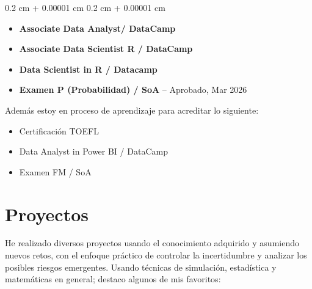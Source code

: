 \documentclass[10pt, letterpaper]{article}
\newenvironment{highlightsforbulletentries}{
    \begin{itemize}[
        topsep=0.10 cm,
        parsep=0.10 cm,
        partopsep=0pt,
        itemsep=0pt,
        leftmargin=10pt
    ]
}{
    \end{itemize}
} %
\newenvironment{onecolentry}{
    \begin{adjustwidth}{
        0.2 cm + 0.00001 cm
    }{
        0.2 cm + 0.00001 cm
    }
}{
    \end{adjustwidth}
} %
\let\hrefWithoutArrow\href
\renewcommand{\href}[2]{\hrefWithoutArrow{#1}{\ifthenelse{\equal{#2}{}}{ }{#2 }\raisebox{.15ex}{\footnotesize \faExternalLink*}}}
\begin{document}
    \begin{onecolentry}
        \begin{highlightsforbulletentries}
            \item \textbf{Associate Data Analyst/ DataCamp} \href{https://drive.google.com/file/d/1EqzyjRkWOJBlU9zUTpkcUcj6QtuXRZfK/view?usp=sharing}{}
            \item \textbf{Associate Data Scientist R / DataCamp} \href{https://drive.google.com/file/d/1xVLk15A1LBbyXH1fZnd4eBTaJ4d8FLLO/view?usp=sharing}{}
            \item \textbf{Data Scientist in R / Datacamp }\href{https://drive.google.com/file/d/1Woe6xqxofloFZ9uM2f5VsdGxY-WQWCRI/view?usp=sharing}{} \\
            \item \textbf{Examen P (Probabilidad) / SoA} -- Aprobado, Mar 2026 \href{https://drive.google.com/file/d/1Qp8ymh9TK8Y52AvmlXe_pZif3NMRZceA/view?usp=drivesdk}{}
        \end{highlightsforbulletentries}

            Además estoy en proceso de aprendizaje para acreditar lo siguiente:

        \begin{highlightsforbulletentries}
            \item Certificación TOEFL
            \item Data Analyst in Power BI / DataCamp
            \item Examen FM / SoA
        \end{highlightsforbulletentries}
    \end{onecolentry}

\newpage

    \section{Proyectos}

        He realizado diversos proyectos usando el conocimiento adquirido y asumiendo nuevos retos, con el enfoque práctico de controlar la incertidumbre y analizar los posibles riesgos emergentes. Usando técnicas de simulación, estadística y matemáticas en general; destaco algunos de mis favoritos:

\vspace{.2cm}
\end{document}
